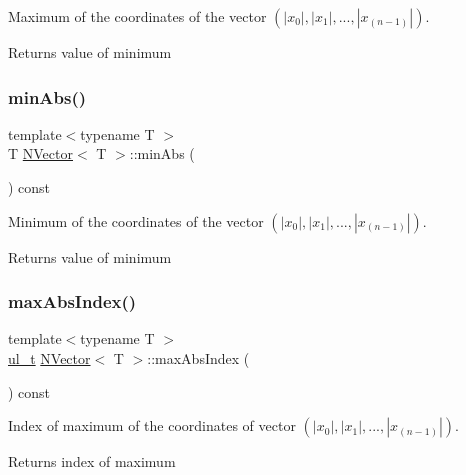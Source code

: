 Maximum of the coordinates of the vector $ (|x_0|, |x_1|, ..., |x_{(n-1)}|) $. 

\begin{DoxyReturn}{Returns}
value of minimum 
\end{DoxyReturn}
\mbox{\label{class_n_vector_a857878b360cede51eb87924cd46d5a54}} 
\subsubsection{\texorpdfstring{minAbs()}{minAbs()}}
{\footnotesize\ttfamily template$<$typename T $>$ \\
T \mbox{\hyperlink{class_n_vector}{N\+Vector}}$<$ T $>$\+::min\+Abs (\begin{DoxyParamCaption}{ }\end{DoxyParamCaption}) const}



Minimum of the coordinates of the vector $ (|x_0|, |x_1|, ..., |x_{(n-1)}|) $. 

\begin{DoxyReturn}{Returns}
value of minimum 
\end{DoxyReturn}
\mbox{\label{class_n_vector_ac7d7d39b68956da9018684a3706a70c2}} 
\subsubsection{\texorpdfstring{maxAbsIndex()}{maxAbsIndex()}}
{\footnotesize\ttfamily template$<$typename T $>$ \\
\mbox{\hyperlink{group___n_algebra_ga1b140a2034db3f5dfe18a987745df43a}{ul\+\_\+t}} \mbox{\hyperlink{class_n_vector}{N\+Vector}}$<$ T $>$\+::max\+Abs\+Index (\begin{DoxyParamCaption}{ }\end{DoxyParamCaption}) const}



Index of maximum of the coordinates of vector $ (|x_0|, |x_1|, ..., |x_{(n-1)}|) $. 

\begin{DoxyReturn}{Returns}
index of maximum 
\end{DoxyReturn}
\mbox{\label{class_n_vector_a8b9147431ee1f9c5a25c6e0b2f793c40}} 
